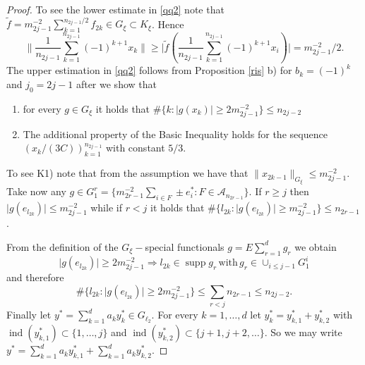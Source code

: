 \documentclass[a4paper]{amsart}
\theoremstyle{plain}
\newcommand{\mca}[1][A]{\mathcal{#1}}
\newcommand{\norm}[1][\cdot]{\lVert #1\rVert}
\DeclareMathOperator{\supp}{supp}
\DeclareMathOperator{\ind}{ind}
\begin{document}
\begin{proof}
To see the lower estimate in \eqref{qq2} note that
$\tilde{f}=m_{2j-1}^{-2}\sum_{k=1}^{n_{2j-1}/2}f_{2k}\in G_{\xi}\subset K_{\xi}$.
Hence
$$
\|\frac{1}{n_{2j-1}}\sum\limits_{k=1}^{n_{2j-1}}
  (-1)^{k+1}x_k\|\geq \vert \tilde{f}(\frac{1}{n_{2j-1}}\sum\limits_{k=1}^{n_{2j-1}}
  (-1)^{k+1}x_i)\vert =m_{2j-1}^{-2}/2.
$$
The upper estimation in \eqref{qq2} follows from Proposition
\ref{ris} b) for $b_{k}=(-1)^{k}$ and $j_0=2j-1$ after we show
that
\begin{enumerate}
 \item[K1)]for every $g\in G_{\xi}$ it holds that $\#\{k:\vert g(x_k)\vert\geq 2m_{2j-1}^{-2}\}\leq n_{2j-2}$
\item[K2)]  The additional property of the Basic Inequality holds for the sequence $(x_k/(3C))_{k=1}^{n_{2j-1}}$ with constant $5/3$.
\end{enumerate}
To see K1) note that from the assumption we have that
$\norm[x_{2k-1}]_{G_{\xi}}\leq m_{2j-1}^{-2}$. Take now any $g\in
G_{1}^{r}=\{m_{2r-1}^{-2}\sum_{i\in F}\pm e_{i}^{*}: F\in \mca_{n_{2r-1}}\}$. If $r\geq j$ then $\vert g(e_{l_{2k}})\vert\leq
m_{2j-1}^{-2}$ while if $r<j$ it holds that $\#\{l_{2k}: \vert
g(e_{l_{2k}})\vert\geq m_{2j-1}^{-2}\}\leq n_{2r-1}$.

From the definition of the $G_\xi-$special functionals $g=E\sum_{r=1}^{d}g_{r}$ we obtain
$$ \vert g(e_{l_{2k}})\vert\geq 2m_{2j-1}^{-2}\Rightarrow l_{2k}\in\supp
g_{r}\,\textrm{with}\,g_{r}\in \cup_{i\leq j-1}G_{1}^{i}
$$
and therefore
$$\#\{l_{2k}: \vert g(e_{l_{2k}})\vert\geq 2m_{2j-1}^{-2}\}\leq \sum_{r<j}n_{2r-1}\leq n_{2j-2}.
$$
Finally let $y^{*} = \sum_{k=1}^d a_ky_k^{*} \in G_{\ell_2}$. For every
$k=1,\dots,d$ let $y_k^{*} = y_{k,1}^{*} + y_{k,2}^{*}$ with
$\ind(y_{k,1}^{*}) \subset\{1,\dots,j\}$ and
$\ind(y_{k,2}^{*}) \subset \{j+1, j+2,\dots\}.$ So we may
write $y^{*}= \sum_{k=1}^d a_k y_{k,1}^{*} + \sum_{k=1}^d a_k
y_{k,2}^{*}.$


\end{proof}
\end{document}
